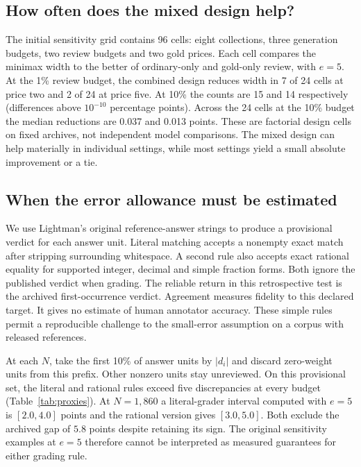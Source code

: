 \documentclass[10pt,letterpaper]{article}
\begin{document}
\subsection*{How often does the mixed design help?}
The initial sensitivity grid contains 96 cells: eight collections, three generation budgets, two review budgets and two gold prices. Each cell compares the minimax width to the better of ordinary-only and gold-only review, with $e=5$. At the 1\% review budget, the combined design reduces width in 7 of 24 cells at price two and 2 of 24 at price five. At 10\% the counts are 15 and 14 respectively (differences above $10^{-10}$ percentage points). Across the 24 cells at the 10\% budget the median reductions are 0.037 and 0.013 points. These are factorial design cells on fixed archives, not independent model comparisons. The mixed design can help materially in individual settings, while most settings yield a small absolute improvement or a tie.

\subsection*{When the error allowance must be estimated}
We use Lightman's original reference-answer strings to produce a provisional verdict for each answer unit. Literal matching accepts a nonempty exact match after stripping surrounding whitespace. A second rule also accepts exact rational equality for supported integer, decimal and simple fraction forms. Both ignore the published verdict when grading. The reliable return in this retrospective test is the archived first-occurrence verdict. Agreement measures fidelity to this declared target. It gives no estimate of human annotator accuracy. These simple rules permit a reproducible challenge to the small-error assumption on a corpus with released references.

At each $N$, take the first 10\% of answer units by $|d_i|$ and discard zero-weight units from this prefix. Other nonzero units stay unreviewed. On this provisional set, the literal and rational rules exceed five discrepancies at every budget (Table~\ref{tab:proxies}). At $N=1{,}860$ a literal-grader interval computed with $e=5$ is $[2.0,4.0]$ points and the rational version gives $[3.0,5.0]$. Both exclude the archived gap of $5.8$ points despite retaining its sign. The original sensitivity examples at $e=5$ therefore cannot be interpreted as measured guarantees for either grading rule.
\end{document}
